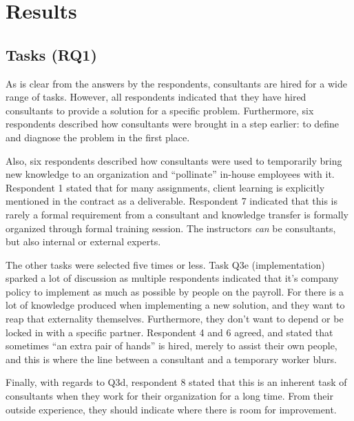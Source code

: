 \documentclass[12pt]{article}
\begin{document}
\section{Results}\label{results}

\subsection{Tasks (RQ1)}\label{tasks-rq1}

As is clear from the answers by the respondents, consultants are hired
for a wide range of tasks. However, all respondents indicated that they
have hired consultants to provide a solution for a specific problem.
Furthermore, six respondents described how consultants were brought in a
step earlier: to define and diagnose the problem in the first place.

Also, six respondents described how consultants were used to temporarily
bring new knowledge to an organization and ``pollinate'' in-house
employees with it. Respondent 1 stated that for many assignments, client
learning is explicitly mentioned in the contract as a deliverable.
Respondent 7 indicated that this is rarely a formal requirement from a
consultant and knowledge transfer is formally organized through formal
training session. The instructors \emph{can} be consultants, but also
internal or external experts.

The other tasks were selected five times or less. Task Q3e
(implementation) sparked a lot of discussion as multiple respondents
indicated that it's company policy to implement as much as possible by
people on the payroll. For there is a lot of knowledge produced when
implementing a new solution, and they want to reap that externality
themselves. Furthermore, they don't want to depend or be locked in with
a specific partner. Respondent 4 and 6 agreed, and stated that sometimes
``an extra pair of hands'' is hired, merely to assist their own people,
and this is where the line between a consultant and a temporary worker
blurs.

Finally, with regards to Q3d, respondent 8 stated that this is an
inherent task of consultants when they work for their organization for a
long time. From their outside experience, they should indicate where
there is room for improvement.

\(~\)
\end{document}
